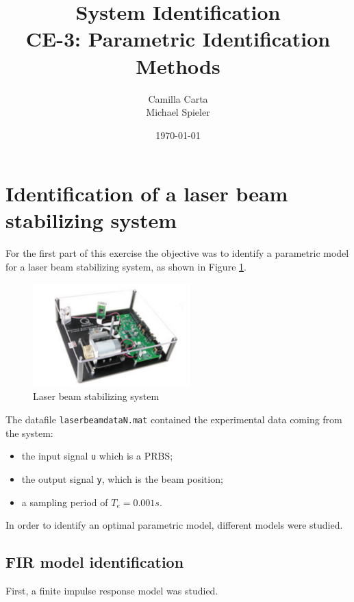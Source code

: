 \documentclass[a4paper,11pt]{article}
\begin{document}
\title{
    System Identification \\
    CE-3: Parametric Identification Methods
}
\author{Camilla Carta \\ Michael Spieler}
\date{\today}
\maketitle

\section{Identification of a laser beam stabilizing system}

For the first part of this exercise the objective was to identify a parametric model for a laser beam stabilizing system, as shown in Figure \ref{fig:systlaserbeam}.

\begin{figure}[H]
\centering
\includegraphics[height = 4cm]{images/laserbeamsystem}
\caption{Laser beam stabilizing system}
\label{fig:systlaserbeam}
\end{figure}

The datafile \texttt{laserbeamdataN.mat} contained the experimental data coming from the system: 

\begin{itemize}
\item the input signal \texttt{u} which is a PRBS;
\item the output signal \texttt{y}, which is the beam position;
\item a sampling period of $T_e = 0.001s$.
\end{itemize}

In order to identify an optimal parametric model, different models were studied.

\subsection{FIR model identification}
First, a finite impulse response model was studied.
\end{document}
